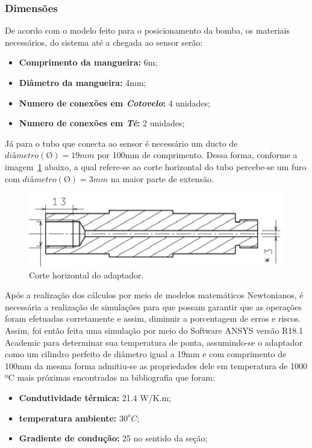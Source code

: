 \subsubsection{Dimensões}
De acordo com o modelo feito para o posicionamento da bomba, os materiais necessários, do sistema até a chegada ao sensor serão: 
\begin{itemize}
	\item \textbf{Comprimento da mangueira:} 6m;
	\item \textbf{Diâmetro da mangueira:} 4mm;
	\item \textbf{Numero de conexões em \emph{Cotovelo}:} 4 unidades;
	\item \textbf{Numero de conexões em \emph{Tê}:} 2 unidades;
\end{itemize}
Já para o tubo que conecta ao sensor é necessário um ducto de $diâmetro(Ø) =19mm$ por 100mm de comprimento. Dessa forma, conforme a imagem~\ref{fig7tc} abaixo, a qual refere-se ao corte horizontal do tubo percebe-se um furo com $diâmetro(Ø) =3mm$ na maior parte de extensão.
\begin{figure}[!htb]                  
	\centering                          
	\includegraphics[scale=1]{figuras/Figura7tc.eps}
	\caption{Corte horizontal  do adaptador.} \label{fig7tc}              
\end{figure}
\newpage
Após a realização dos cálculos por meio de modelos matemáticos Newtonianos, é necessária a realização de simulações para que possam garantir que as operações foram efetuadas corretamente e assim, diminuir a porcentagem de erros e riscos.
Assim, foi então feita uma simulação por meio do Software ANSYS versão R18.1 Academic para determinar sua temperatura de ponta, assumindo-se o adaptador como um cilindro perfeito de diâmetro igual a 19mm e com comprimento de 100mm da mesma forma admitiu-se as propriedades dele em temperatura de 1000 ºC mais próximas encontradas na bibliografia que foram:
\begin{itemize}
	\item \textbf{Condutividade térmica:} 21.4 W/K.m;
	\item \textbf{temperatura ambiente:} $30^oC$;
	\item \textbf{Gradiente de condução:} 25 no sentido da seção;
\end{itemize}
